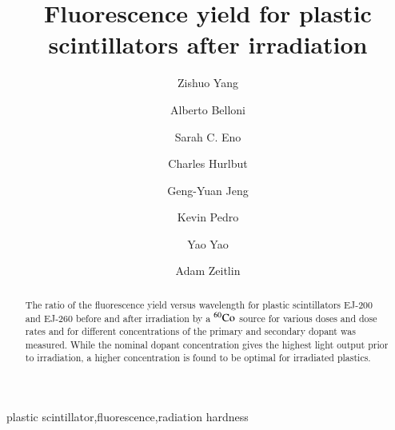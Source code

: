\documentclass[review]{elsarticle}
\begin{document}
\begin{frontmatter}

\title{Fluorescence yield for plastic scintillators after irradiation }


\author[umd]{Zishuo Yang}
\author[umd]{Alberto Belloni}
\author[umd]{Sarah C. Eno}

\author[eljen]{Charles Hurlbut}
\author[umd]{Geng-Yuan Jeng}
\author[fnal]{Kevin Pedro}
\author[umd]{Yao Yao}
\author[umd]{Adam Zeitlin}



\address[umd]{Dept. Physics, U. Maryland, College Park MD 30742 USA}
\address[eljen]{Eljen Technology, 1300 W. Broadway, Sweetwater, TX 79556 USA}
\address[fnal]{Fermi National Accelerator Laboratory, Batavia, IL, USA}

\begin{abstract}
The ratio of the fluorescence yield versus wavelength for plastic scintillators EJ-200 and EJ-260 before and after irradiation by a $\rm {^{60}Co}$ source for various doses and dose rates and for different concentrations of the primary and secondary dopant was measured.  While the nominal dopant concentration gives the highest light output prior to irradiation, a higher concentration is found to be optimal for irradiated plastics.
\end{abstract}

\begin{keyword}
plastic scintillator\sep fluorescence\sep radiation hardness
\end{keyword}

\end{frontmatter}

\linenumbers
\end{document}
